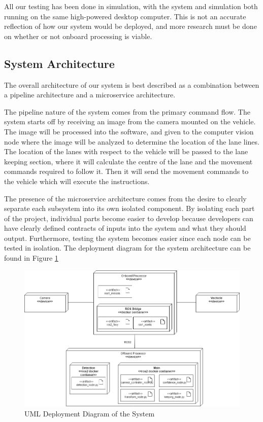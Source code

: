 \documentclass[titlepage, draft]{article}
\begin{document}
All our testing has been done in simulation, with the system and simulation both running on the same high-powered desktop computer. This is not an accurate reflection of how our system would be deployed, and more research must be done on whether or not onboard processing is viable.

\subsection{System Architecture}
The overall architecture of our system is best described as a combination between a pipeline architecture and a microservice architecture.

The pipeline nature of the system comes from the primary command flow. The system starts off by receiving an image from the camera mounted on the vehicle. The image will be processed into the software, and given to the computer vision node where the image will be analyzed to determine the location of the lane lines. The location of the lanes with respect to the vehicle will be passed to the lane keeping section, where it will calculate the centre of the lane and the movement commands required to follow it. Then it will send the movement commands to the vehicle which will execute the instructions.

The presence of the microservice architecture comes from the desire to clearly separate each subsystem into its own isolated component. By isolating each part of the project, individual parts become easier to develop because developers can have clearly defined contracts of inputs into the system and what they should output. Furthermore, testing the system becomes easier since each node can be tested in isolation. The deployment diagram for the system architecture can be found in Figure \ref{fig:deployment}

\begin{figure}
	\centering
	\includegraphics[width=6in]{deployment_uml}
	\caption{UML Deployment Diagram of the System}
	\label{fig:deployment}
\end{figure}
\end{document}
